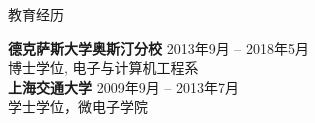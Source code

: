 

\begin{rSection}{教育经历}


{\bf 德克萨斯大学奥斯汀分校} \hfill {2013年9月 -- 2018年5月} \\ 
博士学位, 电子与计算机工程系 \\

{\bf 上海交通大学} \hfill {2009年9月 -- 2013年7月} \\ 
学士学位，微电子学院 \\

\end{rSection}

